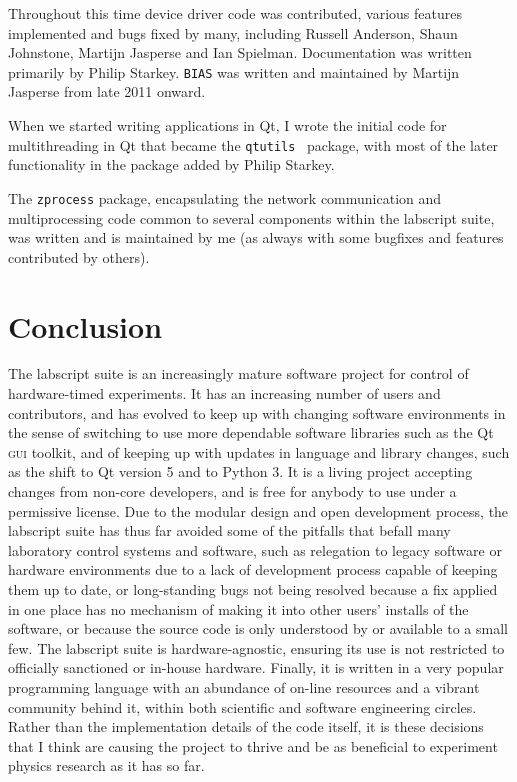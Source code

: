 Throughout this time device driver code was contributed, various features implemented and bugs fixed by many, including Russell Anderson, Shaun Johnstone, Martijn Jasperse and Ian Spielman. Documentation was written primarily by Philip Starkey. \texttt{BIAS} was written and maintained by Martijn Jasperse from late 2011 onward.

When we started writing applications in Qt, I wrote the initial code for multithreading in Qt that became the \texttt{qtutils}~\cite{starkey_qtutils_2018} package, with most of the later functionality in the package added by Philip Starkey.

The \texttt{zprocess} package, encapsulating the network communication and multiprocessing code common to several components within the labscript suite, was written and is maintained by me (as always with some bugfixes and features contributed by others).

\section{Conclusion}

The labscript suite is an increasingly mature software project for control of hardware-timed experiments. It has an increasing number of users and contributors, and has evolved to keep up with changing software environments in the sense of switching to use more dependable software libraries such as the Qt \textsc{gui} toolkit, and of keeping up with updates in language and library changes, such as the shift to Qt version 5 and to Python 3. It is a living project accepting changes from non-core developers, and is free for anybody to use under a permissive license. Due to the modular design and open development process, the labscript suite has thus far avoided some of the pitfalls that befall many laboratory control systems and software, such as relegation to legacy software or hardware environments due to a lack of development process capable of keeping them up to date, or long-standing bugs not being resolved because a fix applied in one place has no mechanism of making it into other users' installs of the software, or because the source code is only understood by or available to a small few. The labscript suite is hardware-agnostic, ensuring its use is not restricted to officially sanctioned or in-house hardware. Finally, it is written in a very popular programming language with an abundance of on-line resources and a vibrant community behind it, within both scientific and software engineering circles. Rather than the implementation details of the code itself, it is these decisions that I think are causing the project to thrive and be as beneficial to experiment physics research as it has so far.


